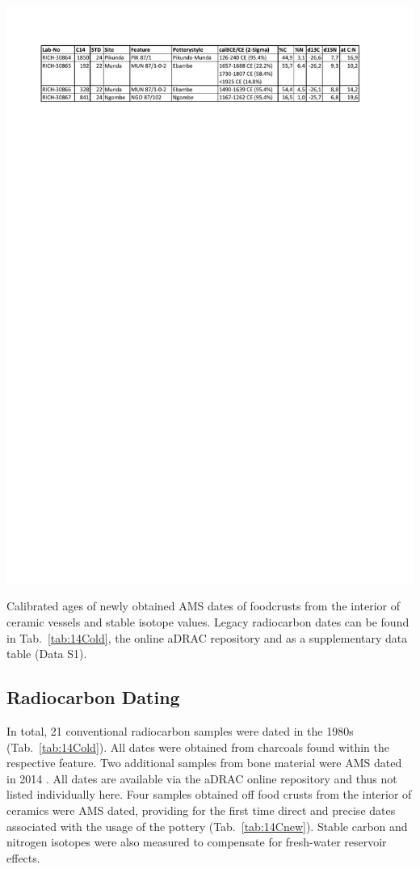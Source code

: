 \documentclass[smallextended,natbib]{svjour3}       %
\begin{document}
\begin{table}[p]
	\centering
	\includegraphics[width=.9\textwidth]{Tab_New14C.pdf}
	\caption{Calibrated ages \citep{Reimer.2020} of newly obtained AMS dates of foodcrusts from the interior of ceramic vessels and stable isotope values. Legacy radiocarbon dates can be found in Tab.~\ref{tab:14Cold}, the online aDRAC repository \citep{Seidensticker.2021f} and as a supplementary data table (Data S1).}
	\label{tab:14Cnew}	
\end{table}

\subsection*{Radiocarbon Dating}

In total, 21 conventional radiocarbon samples were dated in the 1980s (Tab.~\ref{tab:14Cold}). All dates were obtained from charcoals found within the respective feature. Two additional samples from bone material were AMS dated in 2014 \citep[355--356 Appendix 2]{Seidensticker.2021e}. All dates are available via the aDRAC online repository \citep[\url{https://github.com/dirkseidensticker/aDRAC};][]{Seidensticker.2021f} and thus not listed individually here. Four samples obtained off food crusts from the interior of ceramics were AMS dated, providing for the first time direct and precise dates associated with the usage of the pottery (Tab.~\ref{tab:14Cnew}). Stable carbon and nitrogen isotopes were also measured to compensate for fresh-water reservoir effects.
\end{document}
